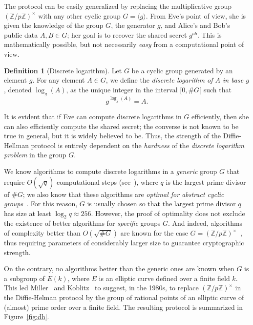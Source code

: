 \documentclass[10pt]{article}
\theoremstyle{plain}
\theoremstyle{definition}
\newtheorem{definition}[theorem]{Definition}
\begin{document}
\begin{prposition}
The protocol can be easily generalized by replacing the multiplicative
group $(ℤ/pℤ)^{×}$ with any other cyclic group $G=〈g〉$. %
From Eve's point of view, she is given the knowledge of the group $G$,
the generator $g$, and Alice's and Bob's public data $A,B∈G$; her goal
is to recover the shared secret $g^{ab}$. %
This is mathematically possible, but not necessarily \emph{easy} from
a computational point of view.

\begin{definition}[Discrete logarithm]
  Let $G$ be a cyclic group generated by an element $g$. For any
  element $A∈G$, we define the \emph{discrete logarithm of $A$ in base
    $g$}, denoted $\log_g(A)$, as the unique integer in the interval
  $[0,\#G[$ such that
  \[g^{\log_g(A)} = A.\]
\end{definition}

It is evident that if Eve can compute discrete logarithms in $G$
efficiently, then she can also efficiently compute the shared secret;
the converse is not known to be true in general, but it is widely
believed to be. %
Thus, the strength of the Diffie-Hellman protocol is entirely
dependent on the \emph{hardness} of the \emph{discrete logarithm
  problem} in the group $G$.

We know algorithms to compute discrete logarithms in a \emph{generic}
group $G$ that require $O(\sqrt{q})$ computational steps
(see~\cite{joux2009algorithmic}), where $q$ is the largest prime
divisor of $\#G$; we also know that these algorithms are \emph{optimal
  for abstract cyclic groups}~\cite{EC:Shoup97}. %
For this reason, $G$ is usually chosen so that the largest prime
divisor $q$ has size at least $\log_2 q ≈ 256$. %
However, the proof of optimality does not exclude the existence of
better algorithms for \emph{specific} groups $G$. %
And indeed, algorithms of complexity better than $O(\sqrt{\#G})$ are
known for the case $G=(ℤ/pℤ)^{×}$~\cite{joux2009algorithmic}, thus
requiring parameters of considerably larger size to guarantee
cryptographic strength.

On the contrary, no algorithms better than the generic ones are known
when $G$ is a subgroup of $E(k)$, where $E$ is an elliptic curve
defined over a finite field $k$. %
This led Miller~\cite{C:Miller85} and
Koblitz~\cite{koblitz87,JC:Koblitz89} to suggest, in the 1980s, to
replace $(ℤ/pℤ)^{×}$ in the Diffie-Helman protocol by the group of
rational points of an elliptic curve of (almost) prime order over a
finite field. %
The resulting protocol is summarized in Figure~\ref{fig:dh}.


\end{prposition}
\end{document}
